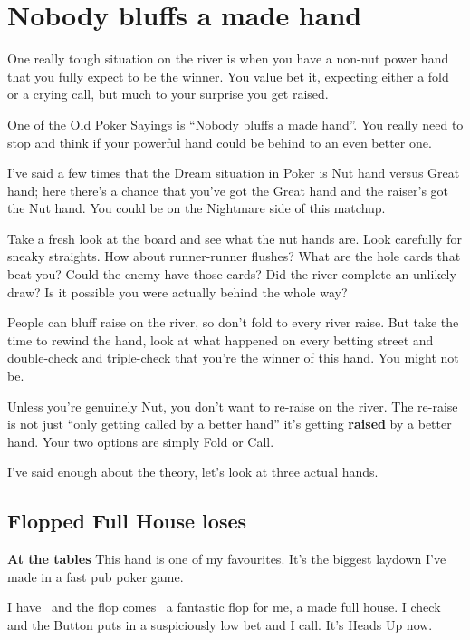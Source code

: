 \chapter{Nobody bluffs a made hand}


One really tough situation on the river is when you have a
non-nut power hand that you fully expect to be the winner.
You value bet it, expecting either a fold or a crying call,
but much to your surprise you get raised.

One of the Old Poker Sayings is ``Nobody bluffs a made hand''.
You really need to stop and think if your powerful hand could
be behind to an even better one.

I've said a few times that the Dream situation in
Poker is Nut hand versus Great hand; here there's a chance
that you've got the Great hand and the raiser's got the Nut hand.
You could be on the Nightmare side of this matchup.

Take a fresh look at the board and see what the nut hands are.
Look carefully for sneaky straights. How about runner-runner flushes?
What are the hole cards that beat you? Could the enemy
have those cards? Did the river complete an unlikely draw? Is it
possible you were actually behind the whole way?

People can bluff raise on the river, so don't fold to every
river raise. But take the time to rewind the hand, look at what
happened on every betting street and double-check and triple-check
that you're the winner of this hand. You might not be.

Unless you're genuinely Nut, you don't want to re-raise on the river.
The re-raise is not just ``only getting called by a better hand'' it's
getting \textbf{raised} by a better hand. Your two options are simply
Fold or Call.

I've said enough about the theory, let's look at three actual hands.

\section{Flopped Full House loses}

\textbf{At the tables} This hand is one of my favourites. It's the
biggest laydown I've made in a fast pub poker game.

I have \trec\tres\ and the flop comes \nined\ninec\tred\, a fantastic
flop for me, a made full house. I check and the Button puts in a
suspiciously low bet and I call. It's Heads Up now.


